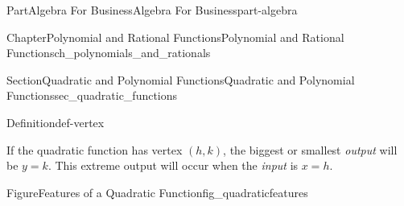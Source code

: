 \documentclass{tufte-book}
\numberwithin{equation}{chapter}
\begin{document}
\begin{partptx}{Part}{Algebra For Business}{}{Algebra For Business}{}{}{part-algebra}
\begin{chapterptx}{Chapter}{Polynomial and Rational Functions}{}{Polynomial and Rational Functions}{}{}{ch_polynomials_and_rationals}
\begin{sectionptx}{Section}{Quadratic and Polynomial Functions}{}{Quadratic and Polynomial Functions}{}{}{sec_quadratic_functions}
\begin{definition}{Definition}{}{def-vertex}
\end{definition}
If the quadratic function has vertex \((h,k)\), the biggest or smallest \emph{output} will be \(y=k\).  This extreme output will occur when the \emph{input} is \(x=h\).%
\begin{figureptx}{Figure}{Features of a Quadratic Function}{fig_quadraticfeatures}{}%
\begin{image}{0.3}{0.4}{0.3}{}%
\end{image}
\end{figureptx}
\end{sectionptx}
\end{chapterptx}
\end{partptx}
\end{document}
